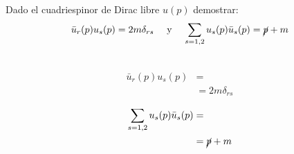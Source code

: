 Dado el cuadriespinor de Dirac libre $u(p)$ demostrar:
$$
{\bar{u}_{r}(p) u_{s}(p)=2 m \delta_{r s}}
\quad\text{ y }\quad
{\sum_{s=1,2} u_{s}(p) \bar{u}_{s}(p)=\cancel{p}+m}
$$

\begin{solution}\ \\
    $$
    \begin{aligned}
        \bar{u}_{r}(p) u_{s}(p) &= \\
        &= 2 m \delta_{r s}
    \end{aligned}
    $$
    

    \begin{align*}
        \sum_{s=1,2} u_{s}(p) \bar{u}_{s}(p) &= \\
        &=\cancel{p}+m
    \end{align*}
    
\end{solution}